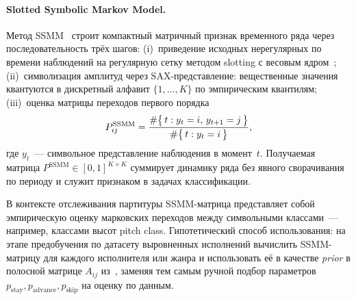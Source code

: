 \paragraph*{Slotted Symbolic Markov Model.} Метод
SSMM~\cite{JohnstonPeter2017,Johnston2020} строит компактный
матричный признак временного ряда через последовательность
трёх шагов: (i)~приведение исходных нерегулярных по времени
наблюдений на регулярную сетку методом slotting с весовым
ядром~\cite{Johnston2020}; (ii)~символизация амплитуд через
SAX-представление: вещественные значения квантуются в дискретный
алфавит $\{1,\dots,K\}$ по эмпирическим квантилям; (iii)~оценка
матрицы переходов первого порядка
\begin{equation}
P_{ij}^{\text{SSMM}}
= \frac{\#\bigl\{\,t : y_t = i,\, y_{t+1} = j\,\bigr\}}
       {\#\bigl\{\,t : y_t = i\,\bigr\}},
\eqlab{ssmm-matrix}
\end{equation}
где $y_t$~--- символьное представление наблюдения в момент~$t$.
Получаемая матрица $P^{\text{SSMM}}\in[0,1]^{K\times K}$
суммирует динамику ряда без явного сворачивания по периоду и
служит признаком в задачах классификации.

В контексте отслеживания партитуры SSMM-матрица представляет
собой эмпирическую оценку марковских переходов между
символьными классами~--- например, классами высот pitch class.
Гипотетический способ использования: на этапе предобучения по
датасету выровненных исполнений вычислить SSMM-матрицу для
каждого исполнителя или жанра и использовать её в качестве
\textit{prior} в полосной матрице $A_{ij}$ из~,
заменяя тем самым ручной подбор параметров $p_{\text{stay}},
p_{\text{advance}}, p_{\text{skip}}$ на оценку по данным.

